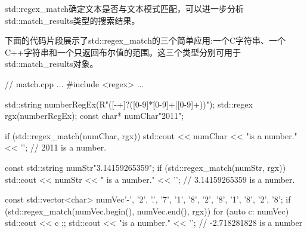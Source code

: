 
std::regex\_match确定文本是否与文本模式匹配，可以进一步分析std::match\_results类型的搜索结果。

下面的代码片段展示了std::regex\_match的三个简单应用:一个C字符串、一个C++字符串和一个只返回布尔值的范围。这三个类型分别可用于std::match\_results对象。


\begin{cpp}
// match.cpp
...
#include <regex>
...

std::string numberRegEx(R"([-+]?([0-9]*\.[0-9]+|[0-9]+))");
std::regex rgx(numberRegEx);
const char* numChar{"2011"};

if (std::regex_match(numChar, rgx)){
	std::cout << numChar << "is a number." << '\n';
} // 2011 is a number.

const std::string numStr{"3.14159265359"};
if (std::regex_match(numStr, rgx)){
	std::cout << numStr << " is a number." << '\n';
} // 3.14159265359 is a number.

const std::vector<char> numVec{{'-', '2', '.', '7', '1', '8', '2',
								'8', '1', '8', '2', '8'}};
if (std::regex_match(numVec.begin(), numVec.end(), rgx)){
	for (auto c: numVec){ std::cout << c ;};
	std::cout << "is a number." << '\n';
} // -2.718281828 is a number
\end{cpp}


































